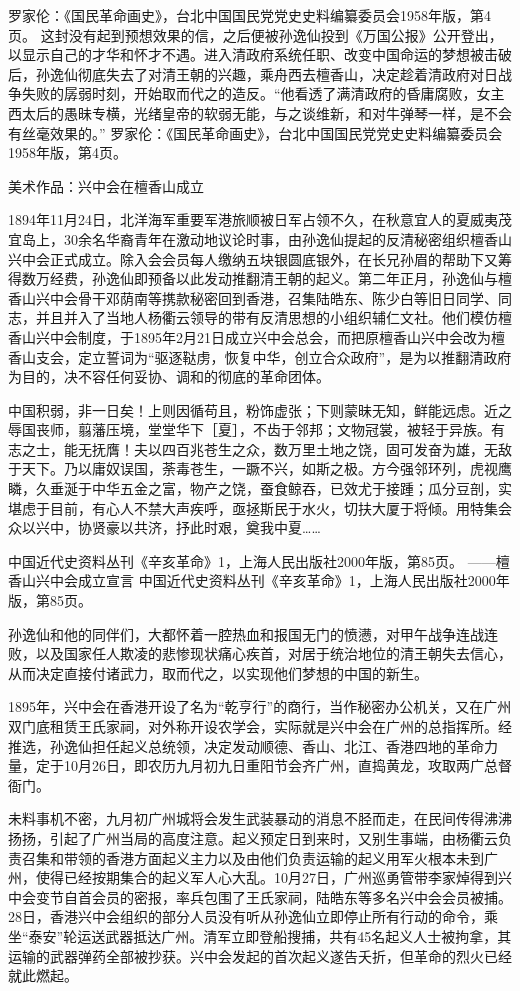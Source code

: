 \documentclass[12pt,UTF8]{ctexbook}
\begin{document}
罗家伦：《国民革命画史》，台北中国国民党党史史料编纂委员会1958年版，第4页。
这封没有起到预想效果的信，之后便被孙逸仙投到《万国公报》公开登出，以显示自己的才华和怀才不遇。进入清政府系统任职、改变中国命运的梦想被击破后，孙逸仙彻底失去了对清王朝的兴趣，乘舟西去檀香山，决定趁着清政府对日战争失败的孱弱时刻，开始取而代之的造反。“他看透了满清政府的昏庸腐败，女主西太后的愚昧专横，光绪皇帝的软弱无能，与之谈维新，和对牛弹琴一样，是不会有丝毫效果的。” 罗家伦：《国民革命画史》，台北中国国民党党史史料编纂委员会1958年版，第4页。


美术作品：兴中会在檀香山成立

1894年11月24日，北洋海军重要军港旅顺被日军占领不久，在秋意宜人的夏威夷茂宜岛上，30余名华裔青年在激动地议论时事，由孙逸仙提起的反清秘密组织檀香山兴中会正式成立。除入会会员每人缴纳五块银圆底银外，在长兄孙眉的帮助下又筹得数万经费，孙逸仙即预备以此发动推翻清王朝的起义。第二年正月，孙逸仙与檀香山兴中会骨干邓荫南等携款秘密回到香港，召集陆皓东、陈少白等旧日同学、同志，并且并入了当地人杨衢云领导的带有反清思想的小组织辅仁文社。他们模仿檀香山兴中会制度，于1895年2月21日成立兴中会总会，而把原檀香山兴中会改为檀香山支会，定立誓词为“驱逐鞑虏，恢复中华，创立合众政府”，是为以推翻清政府为目的，决不容任何妥协、调和的彻底的革命团体。

中国积弱，非一日矣！上则因循苟且，粉饰虚张；下则蒙昧无知，鲜能远虑。近之辱国丧师，翦藩压境，堂堂华下［夏］，不齿于邻邦；文物冠裳，被轻于异族。有志之士，能无抚膺！夫以四百兆苍生之众，数万里土地之饶，固可发奋为雄，无敌于天下。乃以庸奴误国，荼毒苍生，一蹶不兴，如斯之极。方今强邻环列，虎视鹰瞵，久垂涎于中华五金之富，物产之饶，蚕食鲸吞，已效尤于接踵；瓜分豆剖，实堪虑于目前，有心人不禁大声疾呼，亟拯斯民于水火，切扶大厦于将倾。用特集会众以兴中，协贤豪以共济，抒此时艰，奠我中夏……

中国近代史资料丛刊《辛亥革命》1，上海人民出版社2000年版，第85页。
——檀香山兴中会成立宣言 中国近代史资料丛刊《辛亥革命》1，上海人民出版社2000年版，第85页。

孙逸仙和他的同伴们，大都怀着一腔热血和报国无门的愤懑，对甲午战争连战连败，以及国家任人欺凌的悲惨现状痛心疾首，对居于统治地位的清王朝失去信心，从而决定直接付诸武力，取而代之，以实现他们梦想的中国的新生。

1895年，兴中会在香港开设了名为“乾亨行”的商行，当作秘密办公机关，又在广州双门底租赁王氏家祠，对外称开设农学会，实际就是兴中会在广州的总指挥所。经推选，孙逸仙担任起义总统领，决定发动顺德、香山、北江、香港四地的革命力量，定于10月26日，即农历九月初九日重阳节会齐广州，直捣黄龙，攻取两广总督衙门。

未料事机不密，九月初广州城将会发生武装暴动的消息不胫而走，在民间传得沸沸扬扬，引起了广州当局的高度注意。起义预定日到来时，又别生事端，由杨衢云负责召集和带领的香港方面起义主力以及由他们负责运输的起义用军火根本未到广州，使得已经按期集合的起义军人心大乱。10月27日，广州巡勇管带李家焯得到兴中会变节自首会员的密报，率兵包围了王氏家祠，陆皓东等多名兴中会会员被捕。28日，香港兴中会组织的部分人员没有听从孙逸仙立即停止所有行动的命令，乘坐“泰安”轮运送武器抵达广州。清军立即登船搜捕，共有45名起义人士被拘拿，其运输的武器弹药全部被抄获。兴中会发起的首次起义遂告夭折，但革命的烈火已经就此燃起。
\end{document}
